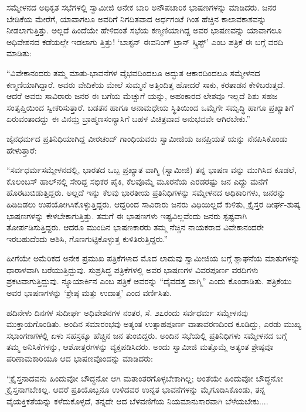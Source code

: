 ಸಮ್ಮೇಳನದ ಅಧಿಕೃತ ಸಭೆಗಳಲ್ಲಿ ಸ್ವಾಮೀಜಿ ಅನೇಕ ಬಾರಿ ಅನೌಪಚಾರಿಕ ಭಾಷಣಗಳನ್ನು ಮಾಡಿದರು. ಜನರ ಬೇಡಿಕೆಯ ಮೇರೆಗೆ, ಯಾವಾಗಲೂ ಅವರಿಗೆ ನಿಗದಿತವಾದ ಅರ್ಧಗಂಟೆ ಗಿಂತ ಹೆಚ್ಚಿನ ಕಾಲಾವಕಾಶವನ್ನು ನೀಡಲಾಗುತ್ತಿತ್ತು. ಅಲ್ಲದೆ ಹಿಂದೆಯೇ ಹೇಳಿದಂತೆ ಸಭೆಯ ಕಣ್ಮಣಿಯಾಗಿದ್ದ ಅವರ ಭಾಷಣವನ್ನು ಯಾವಾಗಲೂ ಅಧಿವೇಶನದ ಕಡೆಯಲ್ಲೇ ಇಡಲಾಗು ತ್ತಿತ್ತು! ‘ಬಾಸ್ಟನ್ ಈವನಿಂಗ್ ಟ್ರಾನ್ ಸ್ಕ್ರಿಪ್ಟ್​’ ಎಂಬ ಪತ್ರಿಕೆ ಈ ಬಗ್ಗೆ ವರದಿ ಮಾಡಿತು:

“ವಿವೇಕಾನಂದರು ತಮ್ಮ ಮಾತು-ಭಾವನೆಗಳ ವೈಭವದಿಂದಲೂ ಅದ್ಭುತ ಆಕಾರದಿಂದಲೂ ಸಮ್ಮೇಳನದ ಕಣ್ಮಣಿಯಾಗಿದ್ದಾರೆ. ಅವರು ವೇದಿಕೆಯ ಮೇಲೆ ಸುಮ್ಮನೆ ಅತ್ತಿಂದಿತ್ತ ಹೋದರೆ ಸಾಕು, ಕರತಾಡನ ಕೇಳಿಬರುತ್ತದೆ. ಆದರೆ ಅವರು ಸಾವಿರಾರು ಜನರ ಈ ಬಗೆಯ ಮೆಚ್ಚುಗೆ ಯನ್ನು, ಅಹಂಕಾರದ ಲೇಶವೂ ಇಲ್ಲದೆ ಶಿಶು ಸಹಜ ಸಂತೃಪ್ತಿಯಿಂದ ಸ್ವೀಕರಿಸುತ್ತಾರೆ. ಬಡತನ ಹಾಗೂ ಅನಾಮಧೇಯ ಸ್ಥಿತಿಯಿಂದ ಒಮ್ಮೆಗೇ ಸಮೃದ್ಧಿ ಹಾಗೂ ಪ್ರಖ್ಯಾತಿಗೆ ಏರುವಂತಾದದ್ದು ಈ ವಿನಮ್ರ ಬ್ರಾಹ್ಮಣಸಂನ್ಯಾಸಿಗೆ ಬಹಳ ವಿಚಿತ್ರವಾದ ಅನುಭವವೇ ಆಗಿರಬೇಕು.”

ಜೈನಧರ್ಮದ ಪ್ರತಿನಿಧಿಯಾಗಿದ್ದ ವೀರಚಂದ್ ಗಾಂಧಿಯವರು ಸ್ವಾಮೀಜಿಯ ಜನಪ್ರಿಯತೆ ಯನ್ನು ನೆನಪಿಸಿಕೊಂಡು ಹೇಳುತ್ತಾರೆ:

“ಸರ್ವಧರ್ಮಸಮ್ಮೇಳನದಲ್ಲಿ, ಭಾರತದ ಒಬ್ಬ ಪ್ರಖ್ಯಾತ ವಾಗ್ಮಿ (ಸ್ವಾಮೀಜಿ) ತನ್ನ ಭಾಷಣ ವನ್ನು ಮುಗಿಸಿದ ಕೂಡಲೆ, ಕೊಲಂಬಸ್ ಹಾಲ್​ನಲ್ಲಿ ಸೇರಿದ್ದ ಸಭಿಕರ ಪೈಕಿ, ಕೆಲವೊಮ್ಮೆ ಮೂರನೆಯ ಎರಡರಷ್ಟು ಜನ ಎದ್ದು ಮನೆಗೆ ಹೊರಟುಬಿಡುತ್ತಿದ್ದರು. ಅಲ್ಲದೆ ಇನ್ನು ಕೆಲವು ಭಾರತೀಯ ಪ್ರತಿನಿಧಿಗಳನ್ನು ಸಮ್ಮೇಳನದ ಅಧಿಕಾರಿಗಳು, ಜನರನ್ನು ಹಿಡಿದಿಡಲು ಉಪಯೋಗಿಸಿಕೊಳ್ಳುತ್ತಿದ್ದರು. ಆದ್ದರಿಂದ ಸಾವಿರಾರು ಜನರು ವಿಧಿಯಿಲ್ಲದೆ ಕುಳಿತು, ಕ್ರೈಸ್ತರ ದೀರ್ಘ-ಶುಷ್ಕ ಭಾಷಣಗಳನ್ನು ಕೇಳಬೇಕಾಗುತ್ತಿತ್ತು. ತಮಗೆ ಈ ಭಾಷಣಗಳು ಇಷ್ಟವಿಲ್ಲವೆಂದು ಜನರು ಸ್ಪಷ್ಟವಾಗಿ ತೋರ್ಪಡಿಸುತ್ತಿದ್ದರು. ಆದರೂ ಮುಂದಿನ ಭಾಷಣಕಾರರು ತಮ್ಮ ನೆಚ್ಚಿನ ನಾಯಕರಾದ ವಿವೇಕಾನಂದರೇ ಇರಬಹುದೆಂದು ಆಶಿಸಿ, ಗೊಣಗುಟ್ಟಿಕೊಳ್ಳುತ್ತ ಕುಳಿತಿರುತ್ತಿದ್ದರು.”

ಹೀಗೆಯೇ ಅಮೆರಿಕದ ಅನೇಕ ಪ್ರಮುಖ ಪತ್ರಿಕೆಗಳಾದ  ಮೊದ ಲಾದುವು ಸ್ವಾಮೀಜಿಯ ಬಗ್ಗೆ ಶ್ಲಾಘನೆಯ ಮಾತುಗಳನ್ನು ಧಾರಾಳವಾಗಿ ಬರೆಯುತ್ತಿದ್ದುವು. ಸುಪ್ರಸಿದ್ಧ ಪತ್ರಿಕೆಗಳಲ್ಲಿ ಅವರ ಭಾಷಣಗಳ ವಿವರಪೂರ್ಣ ವರದಿಗಳು ಪ್ರಕಟವಾಗುತ್ತಿದ್ದುವು. ನ್ಯೂಯಾರ್ಕಿನ  ಎಂಬ ಪತ್ರಿಕೆ ಅವರನ್ನು “ದೈವದತ್ತ ವಾಗ್ಮಿ” ಎಂದು ಕೊಂಡಾಡಿತು.  ಪತ್ರಿಕೆಯು ಅವರ ಭಾಷಣಗಳನ್ನು ‘ಶ್ರೇಷ್ಠ ಮತ್ತು ಉದಾತ್ತ’ ಎಂದ ವರ್ಣಿಸಿತು.

ಹದಿನೇಳು ದಿನಗಳ ಸುದೀರ್ಘ ಅಧಿವೇಶನಗಳ ನಂತರ, ಸೆ. ೨೭ರಂದು ಸರ್ವಧರ್ಮ ಸಮ್ಮೇಳನವು ಮುಕ್ತಾಯಗೊಂಡಿತು. ಅಂದಿನ ಸಮಾರಂಭವು ಅತ್ಯಂತ ಉತ್ಸಾಹಪೂರ್ಣ ವಾತಾವರಣದಿಂದ ಕೂಡಿದ್ದು, ಎರಡು ಮುಖ್ಯ ಸಭಾಂಗಣಗಳಲ್ಲಿ ಏಳು ಸಹಸ್ರಕ್ಕೂ ಹೆಚ್ಚಿನ ಜನ ತುಂಬಿದ್ದರು. ಅಂದಿನ ಸಭೆಯಲ್ಲಿ ಪ್ರತಿನಿಧಿಗಳು ಸಮ್ಮೇಳನದ ಬಗ್ಗೆ ತಮ್ಮ ಅನಿಸಿಕೆಗಳನ್ನು, ಆಶೋತ್ತರಗಳನ್ನು ವ್ಯಕ್ತಪಡಿಸಿದರು. ಅಂದು ಸ್ವಾಮೀಜಿ ಮತ್ತೊಮ್ಮೆ ಅತ್ಯಂತ ಶ್ರೇಷ್ಠವೂ ಪರಿಣಾಮಕಾರಿಯೂ ಆದ ಭಾಷಣವೊಂದನ್ನು ಮಾಡಿದರು:

“ಕ್ರೈಸ್ತನಾದವನು ಹಿಂದುವೋ ಬೌದ್ಧನೋ ಆಗಿ ಮತಾಂತರಗೊಳ್ಳಬೇಕಾಗಿಲ್ಲ; ಅಂತೆಯೇ ಹಿಂದುವೋ ಬೌದ್ಧನೋ ಕ್ರೈಸ್ತನಾಗಬೇಕಿಲ್ಲ. ಆದರೆ ಪ್ರತಿಯೊಬ್ಬನೂ ಉಳಿದವರ ಉನ್ನತ ಭಾವನೆಗಳನ್ನು ಮೈಗೂಡಿಸಿಕೊಂಡು, ತನ್ನ ವೈಯಕ್ತಿಕತೆಯನ್ನು ಕಳೆದುಕೊಳ್ಳದೆ, ತನ್ನದೇ ಆದ ಬೆಳವಣಿಗೆಯ ನಿಯಮಾನುಸಾರವಾಗಿ ಬೆಳೆಯಬೇಕು....

